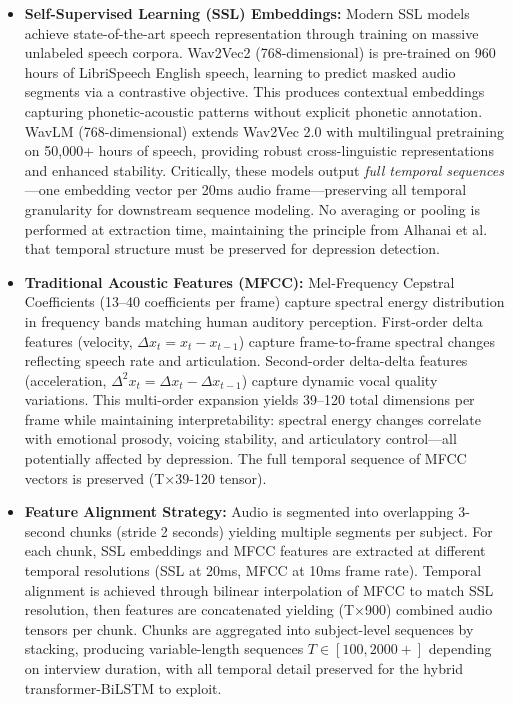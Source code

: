 \documentclass[12pt]{article}
\begin{document}
	\begin{itemize}
		\item \textbf{Self-Supervised Learning (SSL) Embeddings:} Modern SSL models achieve state-of-the-art speech representation through training on massive unlabeled speech corpora. Wav2Vec2 (768-dimensional) is pre-trained on 960 hours of LibriSpeech English speech, learning to predict masked audio segments via a contrastive objective. This produces contextual embeddings capturing phonetic-acoustic patterns without explicit phonetic annotation. WavLM (768-dimensional) extends Wav2Vec 2.0 with multilingual pretraining on 50,000+ hours of speech, providing robust cross-linguistic representations and enhanced stability. Critically, these models output \textit{full temporal sequences}—one embedding vector per 20ms audio frame—preserving all temporal granularity for downstream sequence modeling. No averaging or pooling is performed at extraction time, maintaining the principle from Alhanai et al. that temporal structure must be preserved for depression detection.

		\item \textbf{Traditional Acoustic Features (MFCC):} Mel-Frequency Cepstral Coefficients (13--40 coefficients per frame) capture spectral energy distribution in frequency bands matching human auditory perception. First-order delta features (velocity, $\Delta x_t = x_t - x_{t-1}$) capture frame-to-frame spectral changes reflecting speech rate and articulation. Second-order delta-delta features (acceleration, $\Delta^2 x_t = \Delta x_t - \Delta x_{t-1}$) capture dynamic vocal quality variations. This multi-order expansion yields 39--120 total dimensions per frame while maintaining interpretability: spectral energy changes correlate with emotional prosody, voicing stability, and articulatory control—all potentially affected by depression. The full temporal sequence of MFCC vectors is preserved (T×39-120 tensor).

		\item \textbf{Feature Alignment Strategy:} Audio is segmented into overlapping 3-second chunks (stride 2 seconds) yielding multiple segments per subject. For each chunk, SSL embeddings and MFCC features are extracted at different temporal resolutions (SSL at 20ms, MFCC at 10ms frame rate). Temporal alignment is achieved through bilinear interpolation of MFCC to match SSL resolution, then features are concatenated yielding (T×900) combined audio tensors per chunk. Chunks are aggregated into subject-level sequences by stacking, producing variable-length sequences $T \in [100, 2000+]$ depending on interview duration, with all temporal detail preserved for the hybrid transformer-BiLSTM to exploit.


\end{itemize}
\end{document}
